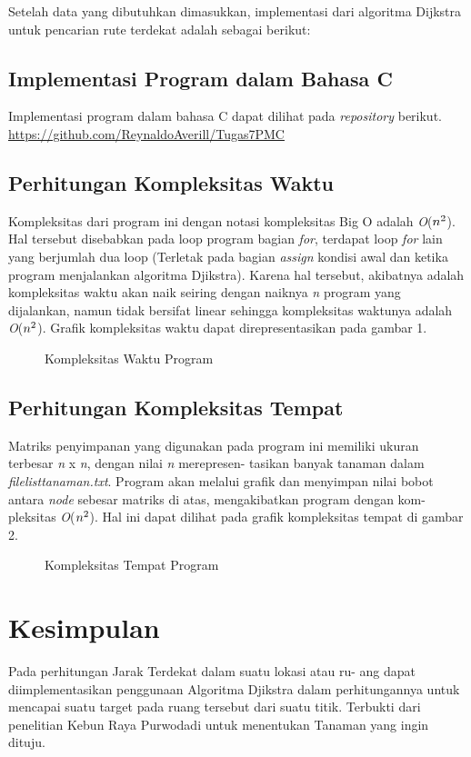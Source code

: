 \documentclass[conference]{IEEEtran}
\begin{document}
    Setelah  data  yang  dibutuhkan  dimasukkan,  implementasi
    dari  algoritma  Dijkstra  untuk  pencarian  rute  terdekat  adalah
    sebagai berikut:\par

\subsection{Implementasi Program dalam Bahasa C}
    Implementasi program dalam bahasa C dapat dilihat
    pada \emph{repository} berikut. \url{https://github.com/ReynaldoAverill/Tugas7PMC}

\subsection{Perhitungan Kompleksitas Waktu}
    Kompleksitas dari program ini dengan notasi kompleksitas
    Big  O  adalah \emph{O}($n\sp{2}$).  Hal  tersebut  disebabkan  pada  loop
    program  bagian \emph{for},  terdapat  loop \emph{for} lain  yang  berjumlah
    dua loop (Terletak pada bagian \emph{assign} kondisi awal dan ketika
    program menjalankan algoritma Djikstra). Karena hal tersebut,
    akibatnya adalah kompleksitas waktu akan naik seiring dengan
    naiknya \emph{n} program  yang  dijalankan,  namun  tidak  bersifat
    linear sehingga kompleksitas waktunya adalah \emph{O}($n\sp{2}$). Grafik
    kompleksitas waktu dapat direpresentasikan pada gambar 1.
\begin{figure}[htbp]
    \centering
    \scalebox{0.3}{}
    \caption{Kompleksitas Waktu Program}
\end{figure}

\subsection{Perhitungan Kompleksitas Tempat}
    Matriks  penyimpanan  yang  digunakan  pada  program  ini
    memiliki  ukuran  terbesar \emph{n} x \emph{n},  dengan  nilai \emph{n} merepresen-
    tasikan  banyak  tanaman  dalam  \emph{filelisttanaman.txt}.  Program
    akan  melalui  grafik  dan  menyimpan  nilai  bobot  antara \emph{node}
    sebesar matriks di atas, mengakibatkan program dengan kom-
    pleksitas \emph{O}($n\sp{2}$). Hal ini dapat dilihat pada grafik kompleksitas
    tempat di gambar 2.
\begin{figure}[htbp]
    \centering
    \scalebox{0.3}{}
    \caption{Kompleksitas Tempat Program}
\end{figure}
    

\section{Kesimpulan}
    Pada perhitungan Jarak Terdekat dalam suatu lokasi atau ru-
    ang dapat diimplementasikan penggunaan Algoritma Djikstra
    dalam perhitungannya untuk mencapai suatu target pada ruang
    tersebut  dari suatu  titik.  Terbukti dari  penelitian Kebun  Raya
    Purwodadi untuk menentukan Tanaman yang ingin dituju.



\end{document}
